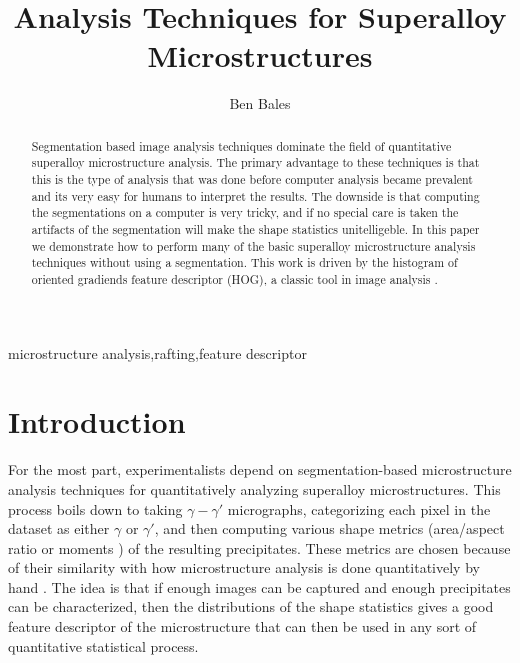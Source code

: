 \documentclass[review]{elsarticle}
\date{}
\begin{document}
	\begin{frontmatter}
		\title{Analysis Techniques for Superalloy Microstructures}

		\author{Ben Bales}
		\address{University of California Santa Barbara}

		\begin{abstract}
			Segmentation based image analysis techniques dominate the field of quantitative superalloy microstructure analysis. The primary advantage to these techniques is that this is the type of analysis that was done before computer analysis became prevalent and its very easy for humans to interpret the results. The downside is that computing the segmentations on a computer is very tricky, and if no special care is taken the artifacts of the segmentation will make the shape statistics unitelligeble. In this paper we demonstrate how to perform many of the basic superalloy microstructure analysis techniques without using a segmentation. This work is driven by the histogram of oriented gradiends feature descriptor (HOG), a classic tool in image analysis \cite{gradtex, hog, girsh}.
		\end{abstract}

		\begin{keyword}
			microstructure analysis\sep rafting\sep feature descriptor
		\end{keyword}
	\end{frontmatter}

	\section{Introduction}
	For the most part, experimentalists depend on segmentation-based microstructure analysis techniques for quantitatively analyzing superalloy microstructures. This process boils down to taking $\gamma-\gamma'$ micrographs, categorizing each pixel in the dataset as either $\gamma$ or $\gamma'$, and then computing various shape metrics (area/aspect ratio \cite{underwood} or moments \cite{twoDM, threeDM}) of the resulting precipitates. These metrics are chosen because of their similarity with how microstructure analysis is done quantitatively by hand \cite{sluytman}. The idea is that if enough images can be captured and enough precipitates can be characterized, then the distributions of the shape statistics gives a good feature descriptor of the microstructure that can then be used in any sort of quantitative statistical process.
\end{document}
